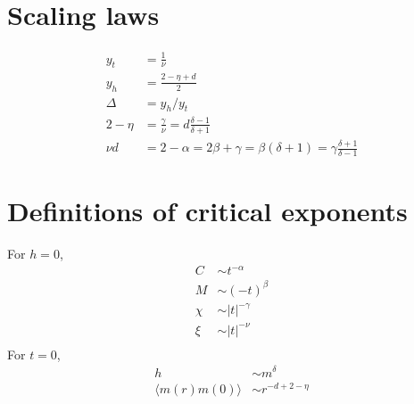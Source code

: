 \section{Scaling laws}
\begin{align}
  y_t &= \frac{1}{\nu}\\
  y_h &= \frac{2-\eta +d}{2}\\
  \Delta &= y_h/y_t\\
	2 - \eta &= \frac{\gamma}{\nu} = d\frac{\delta -1}{\delta+1}\\
	\nu d &= 2-\alpha = 2\beta + \gamma = \beta(\delta+1) = \gamma\frac{\delta +1}{\delta -1}
\end{align}
\section{Definitions of critical exponents}
For $h=0$,
\begin{align}
  C &\sim t^{-\alpha}\\
  M &\sim (-t)^{\beta}\\
  \chi &\sim |t|^{-\gamma}\\
  \xi &\sim |t|^{-\nu}\\
\end{align}  
For $t =0$,
\begin{align}
  h &\sim m^{\delta}\\
  \langle m(r)m(0)\rangle &\sim r^{-d +2 -\eta}
  \label{}
\end{align}
